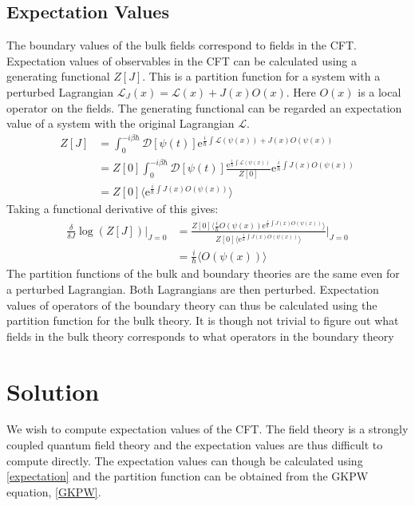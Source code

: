 \documentclass[12pt]{book}
\newcommand{\e}{\ensuremath{\mathrm{e}}}
\renewcommand{\L}{\ensuremath{\mathcal{L}}}
\renewcommand{\i}{\ensuremath{i}}
\begin{document}
\subsection{Expectation Values}
The boundary values of the bulk fields correspond to fields in the CFT. Expectation values of observables in the CFT can be calculated using a generating functional $Z[J]$. This is a partition function for a system with a perturbed Lagrangian $\L_J(x)=\L(x)+J(x)O(x)$. Here $O(x)$ is a local operator on the fields. The generating functional can be regarded an expectation value of a system with the original Lagrangian $\L$.
\begin{equation}
\begin{split}
 Z[J]&=\int_0^{-\i\beta\hbar} \mathcal{D}[\psi(t)]\e^{\frac{\i}{\hbar}\int \L(\psi(x))+J(x)O(\psi(x))}\\
&=Z[0]\int_0^{-\i\beta\hbar} \mathcal{D}[\psi(t)]\frac{\e^{\frac{\i}{\hbar}\int \L(\psi(x))}}{Z[0]}\e^{\frac{\i}{\hbar}\int J(x)O(\psi(x))}\\
&=Z[0]\langle\e^{\frac{\i}{\hbar}\int J(x)O(\psi(x))}\rangle
\end{split}
\end{equation}
Taking a functional derivative of this gives:
\begin{equation}
\begin{split}
 \frac{\delta}{\delta J}\log(Z[J])|_{J=0}&=\frac{Z[0]\langle\frac{\i}{\hbar}O(\psi(x))\e^{\frac{\i}{\hbar}\int J(x)O(\psi(x))}\rangle}{  Z[0]\langle\e^{\frac{\i}{\hbar}\int J(x)O(\psi(x))}\rangle }\big |_{J=0}\\
&=\frac{\i}{\hbar}\langle O(\psi(x))\rangle\label{expectation}
\end{split}
\end{equation}
The partition functions of the bulk and boundary theories are the same even for a perturbed Lagrangian. Both Lagrangians are then perturbed. Expectation values of operators of the boundary theory can thus be calculated using the partition function for the bulk theory. It is though not trivial to figure out what fields in the bulk theory corresponds to what operators in the boundary theory
\section{Solution}
We wish to compute expectation values of the CFT. The field theory is a strongly coupled quantum field theory and the expectation values are thus difficult to compute directly. The expectation values can though be calculated using \eqref{expectation} and the partition function can be obtained from the GKPW equation, \eqref{GKPW}.\\
\end{document}

